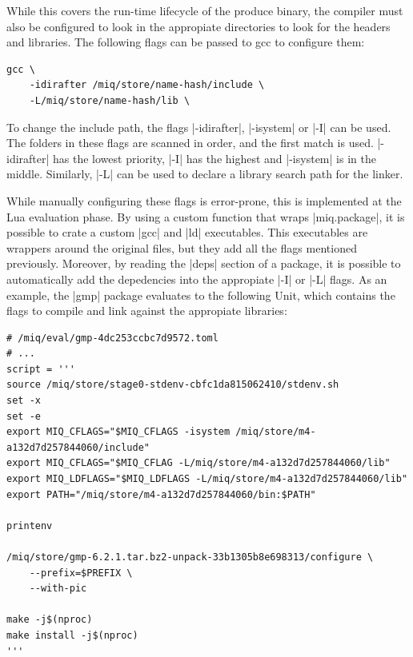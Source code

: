 While this covers the run-time lifecycle of the produce
binary, the compiler must also be configured to look in the
appropiate directories to look for the headers and
libraries. The following flags can be passed to gcc to
configure them:

\begin{verbatim}
gcc \
    -idirafter /miq/store/name-hash/include \
    -L/miq/store/name-hash/lib \
\end{verbatim}

To change the include path, the flags |-idirafter|,
|-isystem| or |-I| can be used. The folders in these flags
are scanned in order, and the first match is used.
|-idirafter| has the lowest priority, |-I| has the highest
and |-isystem| is in the middle.
Similarly, |-L| can be used to declare a library search path
for the linker.

While manually configuring these flags is error-prone, this
is implemented at the Lua evaluation phase. By using a
custom function that wraps |miq.package|, it is possible to
crate a custom |gcc| and |ld| executables. This executables
are wrappers around the original files, but they add all the
flags mentioned previously. Moreover, by reading the |deps|
section of a package, it is possible to automatically add
the depedencies into the appropiate |-I| or |-L| flags. As
an example, the |gmp| package evaluates to the following
Unit, which contains the flags to compile and link against
the appropiate libraries:

\begin{verbatim}
# /miq/eval/gmp-4dc253ccbc7d9572.toml
# ...
script = '''
source /miq/store/stage0-stdenv-cbfc1da815062410/stdenv.sh
set -x
set -e
export MIQ_CFLAGS="$MIQ_CFLAGS -isystem /miq/store/m4-a132d7d257844060/include"
export MIQ_CFLAGS="$MIQ_CFLAG -L/miq/store/m4-a132d7d257844060/lib"
export MIQ_LDFLAGS="$MIQ_LDFLAGS -L/miq/store/m4-a132d7d257844060/lib"
export PATH="/miq/store/m4-a132d7d257844060/bin:$PATH"

printenv

/miq/store/gmp-6.2.1.tar.bz2-unpack-33b1305b8e698313/configure \
    --prefix=$PREFIX \
    --with-pic

make -j$(nproc)
make install -j$(nproc)
'''

\end{verbatim}



